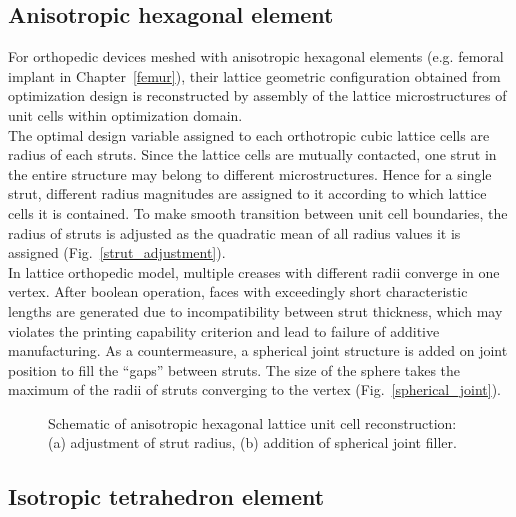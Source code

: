 \documentclass[12pt]{extbook}
\begin{document}
\subsection{Anisotropic hexagonal element}

For orthopedic devices meshed with anisotropic hexagonal elements (e.g. femoral implant in Chapter~\ref{femur}), their lattice geometric configuration obtained from optimization design is reconstructed by assembly of the lattice microstructures of unit cells within optimization domain.\\

The optimal design variable assigned to each orthotropic cubic lattice cells are radius of each struts. Since the lattice cells are mutually contacted, one strut in the entire structure may belong to different microstructures. Hence for a single strut, different radius magnitudes are assigned to it according to which lattice cells it is contained. To make smooth transition between unit cell boundaries, the radius of struts is adjusted as the quadratic mean of all radius values it is assigned (Fig.~\ref{strut_adjustment}).\\

In lattice orthopedic model, multiple creases with different radii converge in one vertex. After boolean operation, faces with exceedingly short characteristic lengths are generated due to incompatibility between strut thickness, which may violates the printing capability criterion and lead to failure of additive manufacturing. As a countermeasure, a spherical joint structure is added on joint position to fill the ``gaps'' between struts. The size of the sphere takes the maximum of the radii of struts converging to the vertex (Fig.~\ref{spherical_joint}).\\

\begin{figure}[htbp]
\centering
{}
\caption{Schematic of anisotropic hexagonal lattice unit cell reconstruction: (a) adjustment of strut radius, (b) addition of spherical joint filler.}
\label{remodel_anis}
\end{figure}


\subsection{Isotropic tetrahedron element}
\label{recon_algo_tetr}
\end{document}
